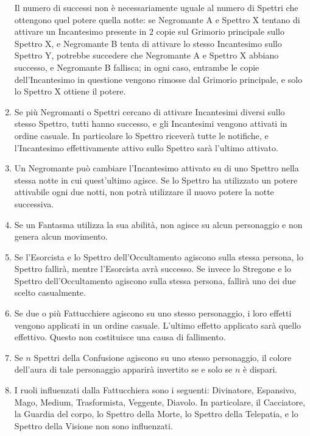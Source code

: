 \documentclass[a4paper,10pt]{article}
\begin{document}
\begin{enumerate}
	Il numero di successi non è necessariamente uguale al numero di Spettri che ottengono quel potere quella notte: se Negromante A e Spettro X tentano di attivare un Incantesimo presente in $2$ copie sul Grimorio principale sullo Spettro X, e Negromante B tenta di attivare lo stesso Incantesimo sullo Spettro Y, potrebbe succedere che Negromante A e Spettro X abbiano successo, e Negromante B fallisca; in ogni caso, entrambe le copie dell'Incantesimo in questione vengono rimosse dal Grimorio principale, e solo lo Spettro X ottiene il potere.
	
	\item Se più Negromanti o Spettri cercano di attivare Incantesimi diversi sullo stesso Spettro, tutti hanno successo, e gli Incantesimi vengono attivati in ordine casuale. In particolare lo Spettro riceverà tutte le notifiche, e l'Incantesimo effettivamente attivo sullo Spettro sarà l'ultimo attivato.
	
	\item Un Negromante può cambiare l'Incantesimo attivato su di uno Spettro nella stessa notte in cui quest'ultimo agisce. Se lo Spettro ha utilizzato un potere attivabile ogni due notti, non potrà utilizzare il nuovo potere la notte successiva.

	\item Se un Fantasma utilizza la sua abilità, non agisce su alcun personaggio e non genera alcun movimento.
	
	\item Se l'Esorcista e lo Spettro dell'Occultamento agiscono sulla stessa persona, lo Spettro fallirà, mentre l'Esorcista avrà successo. Se invece lo Stregone e lo Spettro dell'Occultamento agiscono sulla stessa persona, fallirà uno dei due scelto casualmente.
	
	\item Se due o più Fattucchiere agiscono su uno stesso personaggio, i loro effetti vengono applicati in un ordine casuale. L'ultimo effetto applicato sarà quello effettivo. Questo non costituisce una causa di fallimento.

	\item Se $n$ Spettri della Confusione agiscono su uno stesso personaggio, il colore dell'aura di tale personaggio apparirà invertito se e solo se $n$ è dispari.
	
	\item I ruoli influenzati dalla Fattucchiera sono i seguenti: Divinatore, Espansivo, Mago, Medium, Trasformista, Veggente, Diavolo. In particolare, il Cacciatore, la Guardia del corpo, lo Spettro della Morte, lo Spettro della Telepatia, e lo Spettro della Visione non sono influenzati.


\end{enumerate}
\end{document}
